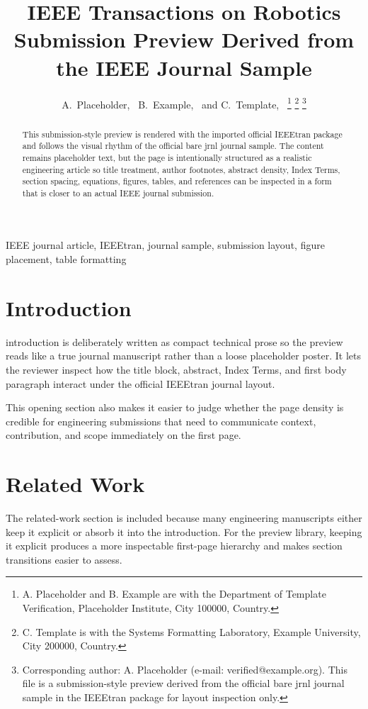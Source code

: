 \documentclass[journal]{IEEEtran}
\title{IEEE Transactions on Robotics\\\large Submission Preview Derived from the IEEE Journal Sample}
\author{A.~Placeholder,~\IEEEmembership{Member,~IEEE,}%
B.~Example,~\IEEEmembership{Senior Member,~IEEE,}%
and C.~Template,~\IEEEmembership{Member,~IEEE}%
\thanks{A. Placeholder and B. Example are with the Department of Template Verification, Placeholder Institute, City 100000, Country.}%
\thanks{C. Template is with the Systems Formatting Laboratory, Example University, City 200000, Country.}%
\thanks{Corresponding author: A. Placeholder (e-mail: verified@example.org). This file is a submission-style preview derived from the official bare jrnl journal sample in the IEEEtran package for layout inspection only.}}
\begin{document}
\maketitle
\begin{abstract}
This submission-style preview is rendered with the imported official IEEEtran package and follows the visual rhythm of the official bare jrnl journal sample. The content remains placeholder text, but the page is intentionally structured as a realistic engineering article so title treatment, author footnotes, abstract density, Index Terms, section spacing, equations, figures, tables, and references can be inspected in a form that is closer to an actual IEEE journal submission.
\end{abstract}
\begin{IEEEkeywords}
IEEE journal article, IEEEtran, journal sample, submission layout, figure placement, table formatting
\end{IEEEkeywords}
\section{Introduction}
 introduction is deliberately written as compact technical prose so the preview reads like a true journal manuscript rather than a loose placeholder poster. It lets the reviewer inspect how the title block, abstract, Index Terms, and first body paragraph interact under the official IEEEtran journal layout.

This opening section also makes it easier to judge whether the page density is credible for engineering submissions that need to communicate context, contribution, and scope immediately on the first page.
\section{Related Work}
The related-work section is included because many engineering manuscripts either keep it explicit or absorb it into the introduction. For the preview library, keeping it explicit produces a more inspectable first-page hierarchy and makes section transitions easier to assess.
\end{document}
